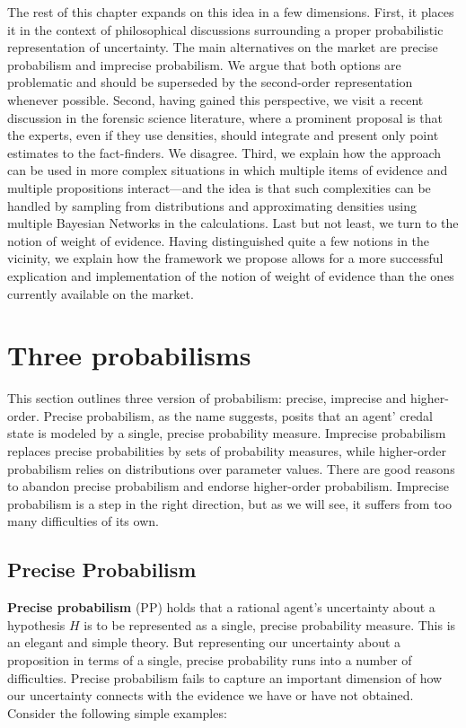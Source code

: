 \documentclass[
  10pt,
  dvipsnames,enabledeprecatedfontcommands]{scrartcl}
\begin{document}
The rest of this chapter expands on this idea in a few dimensions.
First, it places it in the context of philosophical discussions
surrounding a proper probabilistic representation of uncertainty. The
main alternatives on the market are precise probabilism and imprecise
probabilism. We argue that both options are problematic and should be
superseded by the second-order representation whenever possible. Second,
having gained this perspective, we visit a recent discussion in the
forensic science literature, where a prominent proposal is that the
experts, even if they use densities, should integrate and present only
point estimates to the fact-finders. We disagree. Third, we explain how
the approach can be used in more complex situations in which multiple
items of evidence and multiple propositions interact---and the idea is
that such complexities can be handled by sampling from distributions and
approximating densities using multiple Bayesian Networks in the
calculations. Last but not least, we turn to the notion of weight of
evidence. Having distinguished quite a few notions in the vicinity, we
explain how the framework we propose allows for a more successful
explication and implementation of the notion of weight of evidence than
the ones currently available on the market.

\hypertarget{three-probabilisms}{%
\section{Three probabilisms}\label{three-probabilisms}}

This section outlines three version of probabilism: precise, imprecise
and higher-order. Precise probabilism, as the name suggests, posits that
an agent' credal state is modeled by a single, precise probability
measure. Imprecise probabilism replaces precise probabilities by sets of
probability measures, while higher-order probabilism relies on
distributions over parameter values. There are good reasons to abandon
precise probabilism and endorse higher-order probabilism. Imprecise
probabilism is a step in the right direction, but as we will see, it
suffers from too many difficulties of its own.

\hypertarget{precise-probabilism}{%
\subsection{Precise Probabilism}\label{precise-probabilism}}

\textbf{Precise probabilism} (\textsf{PP}) holds that a rational agent's
uncertainty about a hypothesis \(H\) is to be represented as a single,
precise probability measure. This is an elegant and simple theory. But
representing our uncertainty about a proposition in terms of a single,
precise probability runs into a number of difficulties. Precise
probabilism fails to capture an important dimension of how our
uncertainty connects with the evidence we have or have not obtained.
Consider the following simple examples:
\end{document}
